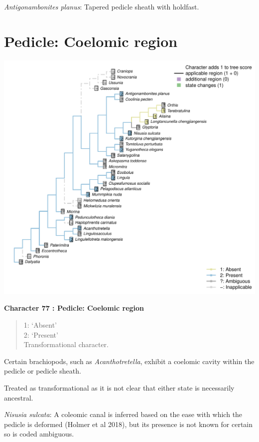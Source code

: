 \documentclass[]{book}
\theoremstyle{definition}
\theoremstyle{definition}
\theoremstyle{definition}
\theoremstyle{remark}
\begin{document}
\emph{Antigonambonites planus}: Tapered pedicle sheath with holdfast.

\hypertarget{pedicle-coelomic-region}{%
\section*{Pedicle: Coelomic region}\label{pedicle-coelomic-region}}

\includegraphics{Brachiopod_phylogeny_files/figure-latex/unnamed-chunk-5-77.pdf}

\textbf{Character 77 : Pedicle: Coelomic region }

\begin{quote}
1: `Absent'\\
2: `Present'\\
Transformational character.
\end{quote}

Certain brachiopods, such as \emph{Acanthotretella}, exhibit a coelomic
cavity within the pedicle or pedicle sheath.

Treated as transformational as it is not clear that either state is
necessarily ancestral.

\emph{Nisusia sulcata}: A coleomic canal is inferred based on the ease
with which the pedicle is deformed (Holmer et al 2018), but its presence
is not known for certain so is coded ambiguous.
\end{document}

